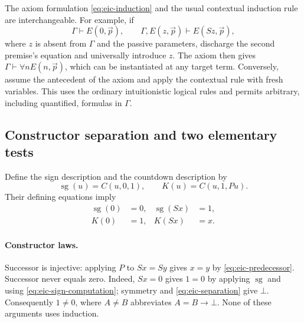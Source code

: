 \documentclass[11pt,letterpaper]{article}
\theoremstyle{definition}\newtheorem{definition}[theorem]{Definition}
\theoremstyle{remark}\newtheorem{remark}[theorem]{Remark}
\begin{document}
The axiom formulation \eqref{eq:eic-induction} and the usual contextual
induction rule are interchangeable.  For example, if
\[
 \Gamma\vdash E(0,\vec p),
 \qquad
 \Gamma,E(z,\vec p)\vdash E(Sz,\vec p),
\]
where $z$ is absent from $\Gamma$ and the passive parameters, discharge the
second premise's equation and universally introduce $z$.  The axiom then
gives $\Gamma\vdash\forall n E(n,\vec p)$, which can be instantiated at any
target term.  Conversely, assume the antecedent of the axiom and apply the
contextual rule with fresh variables.  This uses the ordinary intuitionistic
logical rules and permits arbitrary, including quantified, formulas in
$\Gamma$.

\subsection{Constructor separation and two elementary tests}

Define the sign description and the countdown description by
\begin{equation}
 \operatorname{sg}(u)=C(u,0,1),
 \qquad
 K(u)=C(u,1,Pu).
 \label{eq:eic-sign-countdown}
\end{equation}
Their defining equations imply
\begin{align}
 \operatorname{sg}(0)&=0,
 &\operatorname{sg}(Sx)&=1,\label{eq:eic-sign-computation}\\
 K(0)&=1,
 &K(Sx)&=x.\label{eq:eic-countdown-computation}
\end{align}

\paragraph{Constructor laws.}
Successor is injective: applying $P$ to $Sx=Sy$ gives $x=y$ by
\eqref{eq:eic-predecessor}.  Successor never equals zero.  Indeed,
$Sx=0$ gives $1=0$ by applying $\operatorname{sg}$ and using
\eqref{eq:eic-sign-computation}; symmetry and
\eqref{eq:eic-separation} give $\bot$.  Consequently $1\ne0$, where
$A\ne B$ abbreviates $A=B\to\bot$.  None of these arguments uses
induction.
\end{document}
